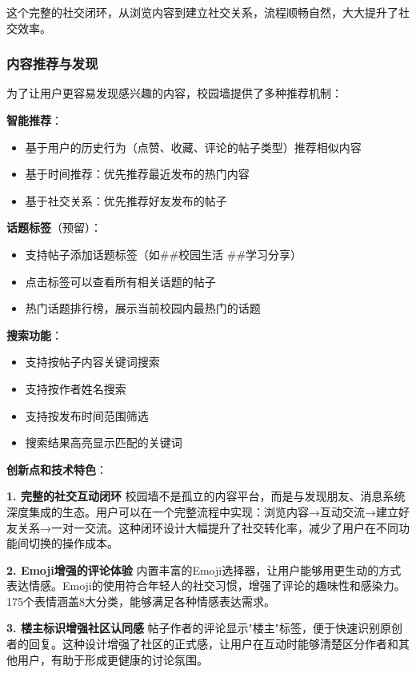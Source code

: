 \documentclass[12pt,a4paper]{article}
\begin{document}
这个完整的社交闭环，从浏览内容到建立社交关系，流程顺畅自然，大大提升了社交效率。

\subsubsection{内容推荐与发现}

为了让用户更容易发现感兴趣的内容，校园墙提供了多种推荐机制：

\textbf{智能推荐}：
\begin{itemize}
    \item 基于用户的历史行为（点赞、收藏、评论的帖子类型）推荐相似内容
    \item 基于时间推荐：优先推荐最近发布的热门内容
    \item 基于社交关系：优先推荐好友发布的帖子
\end{itemize}

\textbf{话题标签}（预留）：
\begin{itemize}
    \item 支持帖子添加话题标签（如\#\#校园生活 \#\#学习分享）
    \item 点击标签可以查看所有相关话题的帖子
    \item 热门话题排行榜，展示当前校园内最热门的话题
\end{itemize}

\textbf{搜索功能}：
\begin{itemize}
    \item 支持按帖子内容关键词搜索
    \item 支持按作者姓名搜索
    \item 支持按发布时间范围筛选
    \item 搜索结果高亮显示匹配的关键词
\end{itemize}

\textbf{创新点和技术特色}：

\textbf{1. 完整的社交互动闭环}
校园墙不是孤立的内容平台，而是与发现朋友、消息系统深度集成的生态。用户可以在一个完整流程中实现：浏览内容→互动交流→建立好友关系→一对一交流。这种闭环设计大幅提升了社交转化率，减少了用户在不同功能间切换的操作成本。

\textbf{2. Emoji增强的评论体验}
内置丰富的Emoji选择器，让用户能够用更生动的方式表达情感。Emoji的使用符合年轻人的社交习惯，增强了评论的趣味性和感染力。175个表情涵盖8大分类，能够满足各种情感表达需求。

\textbf{3. 楼主标识增强社区认同感}
帖子作者的评论显示"楼主"标签，便于快速识别原创者的回复。这种设计增强了社区的正式感，让用户在互动时能够清楚区分作者和其他用户，有助于形成更健康的讨论氛围。
\end{document}
